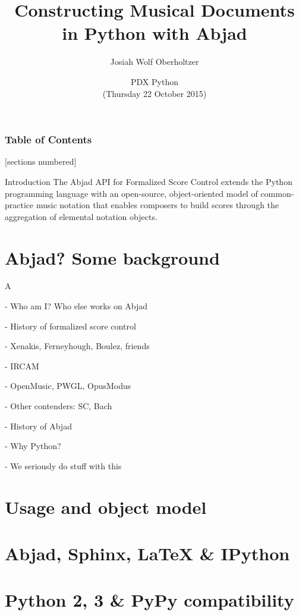 \documentclass[10pt]{beamer}
\title{
    Constructing Musical Documents \protect\\
    in Python with Abjad
}
\subtitle{}
\author{
    Josiah Wolf Oberholtzer \inst{1} \and
}
\institute[shortinst]{
    \inst{1}Department of Music, Harvard University
}
\date[]{
    PDX Python\protect\\
    (Thursday 22 October 2015)
}
\begin{document}
\maketitle

\begin{frame}
    \frametitle{Table of Contents}
    [sections numbered]
    \tableofcontents[hideallsubsections]
\end{frame}

\begin{frame}{Introduction}
The Abjad API for Formalized Score Control extends the Python programming
language with an open-source, object-oriented model of common-practice music
notation that enables composers to build scores through the aggregation of
elemental notation objects.
\end{frame}

\section{Abjad? Some background}

\begin{frame}{A}

- Who am I? Who else works on Abjad

- History of formalized score control

    - Xenakis, Ferneyhough, Boulez, friends

    - IRCAM

    - OpenMusic, PWGL, OpusModus

    - Other contenders: SC, Bach

- History of Abjad

- Why Python?

- We seriously do stuff with this

\end{frame}

\section{Usage and object model}

\section{Abjad, Sphinx, LaTeX \& IPython}

\section{Python 2, 3 \& PyPy compatibility}
\end{document}
